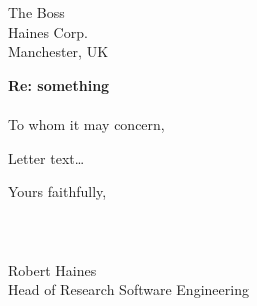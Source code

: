 \documentclass{UoM_letter}
\begin{document}
\begin{letter}{The Boss \\ Haines Corp. \\ Manchester, UK}

\opening{\textbf{Re: something}\\\\To whom it may concern,}

Letter text\ldots



Yours faithfully,\\\\\\\\
Robert Haines\\
Head of Research Software Engineering

\end{letter}
\end{document}
